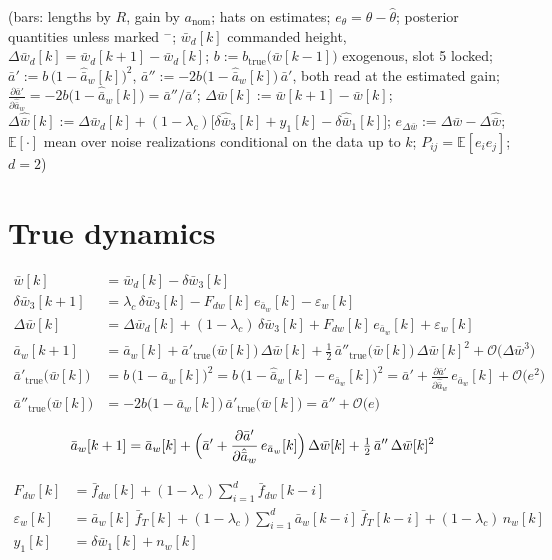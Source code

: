 \documentclass[11pt,a4paper,fontset=none]{ctexart}
\newcommand{\ba}{\bar{a}}
\newcommand{\bw}{\bar{w}}
\newcommand{\E}{\mathbb{E}}
\newcommand{\dW}{\Delta\bw}
\newcommand{\dWh}{\Delta\hat{\bw}}
\newcommand{\eD}{e_{\Delta\bw}}
\newcommand{\ap}{\ba'}
\newcommand{\app}{\ba''}
\newcommand{\dap}{\frac{\partial\ap}{\partial\hat{\ba}_w}}
\begin{document}
(bars: lengths by $R$, gain by $a_{\mathrm{nom}}$; hats on estimates;
$e_{\theta} = \theta - \hat{\theta}$; posterior quantities unless marked $^{-}$;
$\bw_d[k]$ commanded height, $\Delta\bw_d[k] = \bw_d[k+1] - \bw_d[k]$;
$b := b_{\mathrm{true}}\bigl(\bw[k-1]\bigr)$ exogenous, slot 5 locked;
$\ap := b\,\bigl(1 - \hat{\ba}_w[k]\bigr)^{2}$, $\app := -2b\bigl(1 - \hat{\ba}_w[k]\bigr)\,\ap$, both read at the estimated gain;
$\tfrac{\partial\ap}{\partial\hat{\ba}_w} = -2b\bigl(1 - \hat{\ba}_w[k]\bigr) = \app/\ap$;
$\dW[k] := \bw[k+1] - \bw[k]$; $\dWh[k] := \Delta\bw_d[k] + (1-\lambda_c)\bigl[\delta\hat{\bw}_3[k] + y_1[k] - \delta\hat{\bw}_1[k]\bigr]$;
$\eD := \dW - \dWh$;
$\E[\cdot]$ mean over noise realizations conditional on the data up to $k$; $P_{ij} = \E[e_i e_j]$; $d = 2$)

\section{True dynamics}

\begin{align*}
\bw[k]            &= \bw_d[k] - \delta\bw_3[k] \\
\delta\bw_3[k+1]  &= \lambda_c\,\delta\bw_3[k] - F_{dw}[k]\,e_{\ba_w}[k] - \varepsilon_w[k] \\
\dW[k]            &= \Delta\bw_d[k] + (1-\lambda_c)\,\delta\bw_3[k] + F_{dw}[k]\,e_{\ba_w}[k] + \varepsilon_w[k] \\
\ba_w[k+1] &= \ba_w[k] + \ap_{\mathrm{true}}\bigl(\bw[k]\bigr)\,\dW[k]
                       + \tfrac{1}{2}\,\app_{\mathrm{true}}\bigl(\bw[k]\bigr)\,\dW[k]^{2} + \mathcal{O}\bigl(\dW^{3}\bigr) \\
\ap_{\mathrm{true}}\bigl(\bw[k]\bigr)  &= b\,\bigl(1 - \ba_w[k]\bigr)^{2}
                                        = b\,\bigl(1 - \hat{\ba}_w[k] - e_{\ba_w}[k]\bigr)^{2}
                                        = \ap + \dap\,e_{\ba_w}[k] + \mathcal{O}\bigl(e^{2}\bigr) \\
\app_{\mathrm{true}}\bigl(\bw[k]\bigr) &= -2b\bigl(1 - \ba_w[k]\bigr)\,\ap_{\mathrm{true}}\bigl(\bw[k]\bigr) = \app + \mathcal{O}\bigl(e\bigr)
\end{align*}

\begin{align*}
\ba_w[k+1] &= \ba_w[k] + \Bigl(\ap + \dap\,e_{\ba_w}[k]\Bigr)\,\dW[k] + \tfrac{1}{2}\,\app\,\dW[k]^{2}
\end{align*}

\begin{align*}
F_{dw}[k]        &= \bar{f}_{dw}[k] + (1-\lambda_c)\sum_{i=1}^{d}\bar{f}_{dw}[k-i] \\
\varepsilon_w[k] &= \ba_w[k]\,\bar{f}_T[k] + (1-\lambda_c)\sum_{i=1}^{d}\ba_w[k-i]\,\bar{f}_T[k-i] + (1-\lambda_c)\,n_w[k] \\
y_1[k]           &= \delta\bw_1[k] + n_w[k]
\end{align*}
\end{document}
